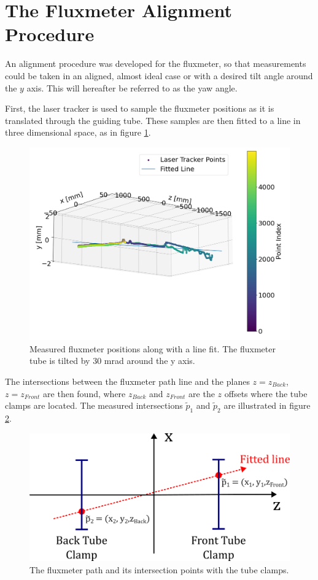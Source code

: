 \section{The Fluxmeter Alignment Procedure}
An alignment procedure was developed for the fluxmeter, so that
measurements could be taken in an aligned, almost ideal case
or with a desired tilt angle around the $y$ axis. This will
hereafter be referred to as the yaw angle.

First, the laser tracker is used to sample the fluxmeter positions
as it is translated through the guiding tube. These samples are then fitted to
a line in three dimensional space, as in figure \ref{fig:geomfit}.

\begin{figure}[!h]
    \centering
    \includegraphics[width=0.8\linewidth]{figs/geomfit}
    \caption{Measured fluxmeter positions along with a line
        fit. The fluxmeter tube is tilted by $30$ mrad around the y axis.}
    \label{fig:geomfit}
\end{figure}

The intersections between the fluxmeter path line and the
planes $z = z_{Back}$, $z = z_{Front}$ are then found, where
$z_{Back}$ and $z_{Front}$ are the $z$ offsets where the tube clamps
are located. The measured intersections $\tilde{p}_1$ and $\tilde{p}_2$
are illustrated in figure \ref{fig:alignment}.

\begin{figure}[!h]
    \centering
    \includegraphics[width=0.8\linewidth]{figs/alignment}
    \caption{The fluxmeter path and its intersection points with
        the tube clamps.}
    \label{fig:alignment}
\end{figure}

